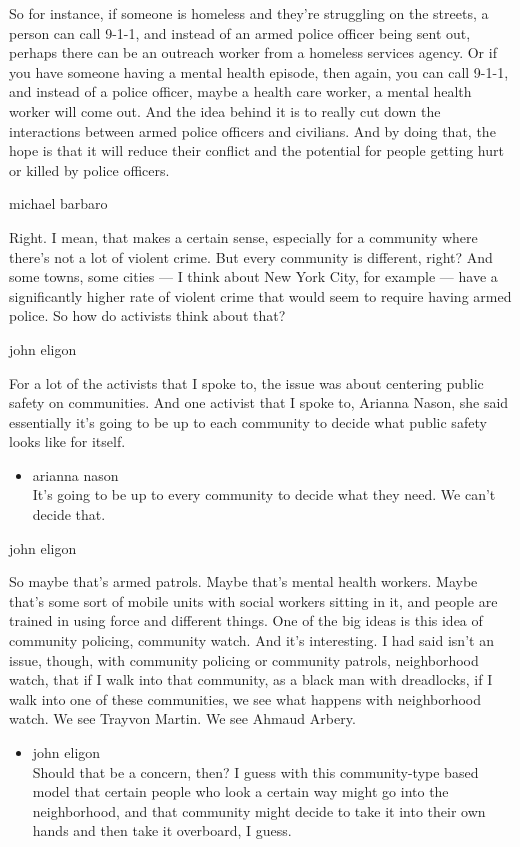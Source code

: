 So for instance, if someone is homeless and they're struggling on the
streets, a person can call 9-1-1, and instead of an armed police officer
being sent out, perhaps there can be an outreach worker from a homeless
services agency. Or if you have someone having a mental health episode,
then again, you can call 9-1-1, and instead of a police officer, maybe a
health care worker, a mental health worker will come out. And the idea
behind it is to really cut down the interactions between armed police
officers and civilians. And by doing that, the hope is that it will
reduce their conflict and the potential for people getting hurt or
killed by police officers.

michael barbaro

Right. I mean, that makes a certain sense, especially for a community
where there's not a lot of violent crime. But every community is
different, right? And some towns, some cities --- I think about New York
City, for example --- have a significantly higher rate of violent crime
that would seem to require having armed police. So how do activists
think about that?

john eligon

For a lot of the activists that I spoke to, the issue was about
centering public safety on communities. And one activist that I spoke
to, Arianna Nason, she said essentially it's going to be up to each
community to decide what public safety looks like for itself.

\begin{itemize}
\tightlist
\item
  arianna nason\\
  It's going to be up to every community to decide what they need. We
  can't decide that.
\end{itemize}

john eligon

So maybe that's armed patrols. Maybe that's mental health workers. Maybe
that's some sort of mobile units with social workers sitting in it, and
people are trained in using force and different things. One of the big
ideas is this idea of community policing, community watch. And it's
interesting. I had said isn't an issue, though, with community policing
or community patrols, neighborhood watch, that if I walk into that
community, as a black man with dreadlocks, if I walk into one of these
communities, we see what happens with neighborhood watch. We see Trayvon
Martin. We see Ahmaud Arbery.

\begin{itemize}
\tightlist
\item
  john eligon\\
  Should that be a concern, then? I guess with this community-type based
  model that certain people who look a certain way might go into the
  neighborhood, and that community might decide to take it into their
  own hands and then take it overboard, I guess.
\end{itemize}

